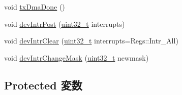 \begin{DoxyCompactItemize}
\item 
void \hyperlink{classSinic_1_1Device_a5204e0ceaa6484825f9506e447e072c6}{txDmaDone} ()
\item 
void \hyperlink{classSinic_1_1Device_ad1a6ea4f31e657c02d56bdf168fb988a}{devIntrPost} (\hyperlink{Type_8hh_a435d1572bf3f880d55459d9805097f62}{uint32\_\-t} interrupts)
\item 
void \hyperlink{classSinic_1_1Device_af2e6de78cabe5fab3233fb1b29fb478b}{devIntrClear} (\hyperlink{Type_8hh_a435d1572bf3f880d55459d9805097f62}{uint32\_\-t} interrupts=Regs::Intr\_\-All)
\item 
void \hyperlink{classSinic_1_1Device_a776f6f1cbea3e0200c28319eb0d5446b}{devIntrChangeMask} (\hyperlink{Type_8hh_a435d1572bf3f880d55459d9805097f62}{uint32\_\-t} newmask)
\end{DoxyCompactItemize}
\subsection*{Protected 変数}
